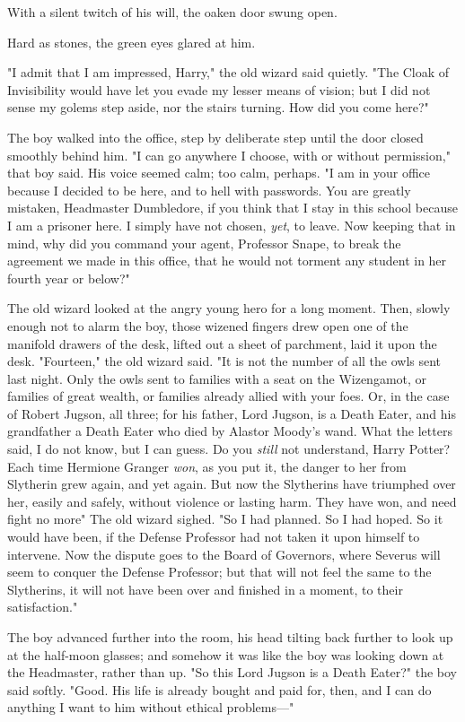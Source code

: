 With a silent twitch of his will, the oaken door swung open.

Hard as stones, the green eyes glared at him.

"I admit that I am impressed, Harry," the old wizard said quietly. "The Cloak
of Invisibility would have let you evade my lesser means of vision; but I did
not sense my golems step aside, nor the stairs turning. How did you come here?"

The boy walked into the office, step by deliberate step until the door closed
smoothly behind him. "I can go anywhere I choose, with or without permission,"
that boy said. His voice seemed calm; too calm, perhaps. "I am in your office
because I decided to be here, and to hell with passwords. You are greatly
mistaken, Headmaster Dumbledore, if you think that I stay in this school
because I am a prisoner here. I simply have not chosen, \emph{yet}, to leave.
Now keeping that in mind, why did you command your agent, Professor Snape, to
break the agreement we made in this office, that he would not torment any
student in her fourth year or below?"

The old wizard looked at the angry young hero for a long moment. Then, slowly
enough not to alarm the boy, those wizened fingers drew open one of the
manifold drawers of the desk, lifted out a sheet of parchment, laid it upon the
desk. "Fourteen," the old wizard said. "It is not the number of all the owls
sent last night. Only the owls sent to families with a seat on the Wizengamot,
or families of great wealth, or families already allied with your foes. Or, in
the case of Robert Jugson, all three; for his father, Lord Jugson, is a Death
Eater, and his grandfather a Death Eater who died by Alastor Moody's wand. What
the letters said, I do not know, but I can guess. Do you \emph{still} not
understand, Harry Potter? Each time Hermione Granger \emph{won}, as you put it,
the danger to her from Slytherin grew again, and yet again. But now the
Slytherins have triumphed over her, easily and safely, without violence or
lasting harm. They have won, and need fight no more{\el}" The old wizard
sighed. "So I had planned. So I had hoped. So it would have been, if the
Defense Professor had not taken it upon himself to intervene. Now the dispute
goes to the Board of Governors, where Severus will seem to conquer the Defense
Professor; but that will not feel the same to the Slytherins, it will not have
been over and finished in a moment, to their satisfaction."

The boy advanced further into the room, his head tilting back further to look
up at the half-moon glasses; and somehow it was like the boy was looking down
at the Headmaster, rather than up. "So this Lord Jugson is a Death Eater?" the
boy said softly. "Good. His life is already bought and paid for, then, and I
can do anything I want to him without ethical problems---"

